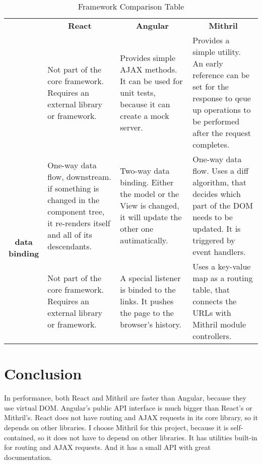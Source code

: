 \begin{center}
	\begin{table}[!htbp]
		\begin{tabular}{|p{3cm}||p{3.5cm}|p{3.5cm}|p{3.5cm}|}\hline
									& \multicolumn{1}{c|}{\textbf{React}}          
									& \multicolumn{1}{c|}{\textbf{Angular}}   
									& \multicolumn{1}{c|}{\textbf{Mithril}} \tabularnewline \hhline{|=#=|=|=|}
		\multicolumn{1}{|c||}{\multirow{7}{*}{\textbf{AJAX requests}}}      
									& Not part of the core framework. Requires an external library or framework.          
									& Provides simple AJAX methods. It can be used for unit tests, because it can create a mock server.
									& Provides a simple utility. An early reference can be set for the response to qeue up operations to be performed after the request completes. \tabularnewline\hline
		\multicolumn{1}{|c||}{\multirow{7}{*}{\textbf{data binding}}} 		
									& One-way data flow, downstream. if something is changed in the component tree, it re-renders itself and all of its descendants.
									& Two-way data binding. Either the model or the View is changed, it will update the other one autimatically.    
									& One-way data flow. Uses a diff algorithm, that decides which part of the DOM needs to be updated. It is triggered by event handlers.   \tabularnewline\hline
		\multicolumn{1}{|c||}{\multirow{6}{*}{\textbf{routing}}}        	
									& Not part of the core framework. Requires an external library or framework.         
									& A special listener is binded to the links. It pushes the page to the browser's history.
									& Uses a key-value map as a routing table, that connects the URLs with Mithril module controllers.    \tabularnewline \hline
	\end{tabular}
	\caption{Framework Comparison Table}
	\label{table:frameworkcomparison}
	\end{table}
\end{center}


\section{Conclusion}
In performance, both React and Mithril are faster than Angular, because they use virtual DOM. Angular's public API interface is much bigger than React's or Mithril's. React does not have routing and AJAX requests in its core library, so it depends on other libraries. 
I choose Mithril for this project, because it is  self-contained, so it does not have to depend on other libraries. It has utilities built-in for routing and AJAX requests. And it has a small API with great documentation. 

